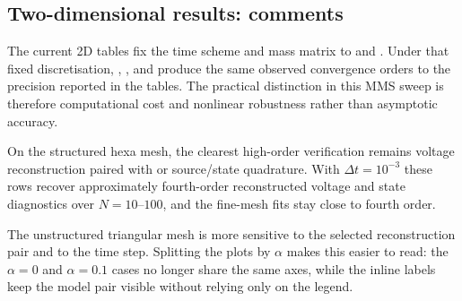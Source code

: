 \subsection{Two-dimensional results: comments}
\label{sec:results-2d-conclusions}

The current 2D tables fix the time scheme and mass matrix to  and . Under that fixed discretisation, , , and  produce the same observed convergence orders to the precision reported in the tables. The practical distinction in this MMS sweep is therefore computational cost and nonlinear robustness rather than asymptotic accuracy.

On the structured hexa mesh, the clearest high-order verification remains  voltage reconstruction paired with  or  source/state quadrature. With $\Delta t=10^{-3}$ these rows recover approximately fourth-order reconstructed voltage and state diagnostics over $N=10$--$100$, and the fine-mesh fits stay close to fourth order.

The unstructured triangular mesh is more sensitive to the selected reconstruction pair and to the time step. Splitting the plots by $\alpha$ makes this easier to read: the $\alpha=0$ and $\alpha=0.1$ cases no longer share the same axes, while the inline labels keep the model pair visible without relying only on the legend.

